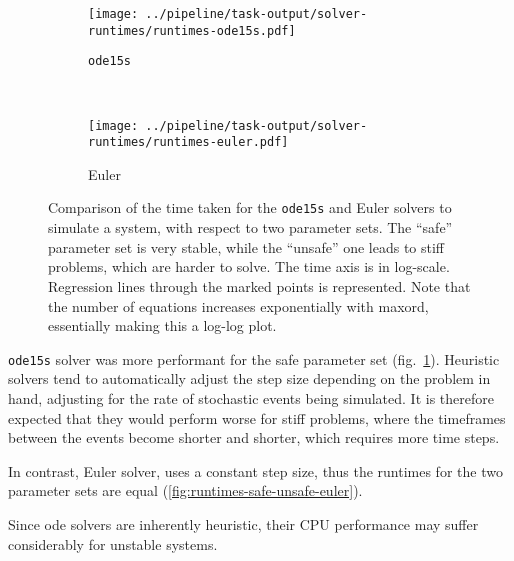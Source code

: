 \begin{figure}[tb]
   \centering
   \begin{subfigure}[t]{0.45\textwidth}
       \texttt{[image: ../pipeline/task-output/solver-runtimes/runtimes-ode15s.pdf]}
       \caption{\texttt{ode15s}}
       \label{fig:runtimes-safe-unsafe-ode15s}
   \end{subfigure}
   ~
   \begin{subfigure}[t]{0.45\textwidth}
       \texttt{[image: ../pipeline/task-output/solver-runtimes/runtimes-euler.pdf]}
       \caption{Euler}
       \label{fig:runtimes-safe-unsafe-euler}
   \end{subfigure}
   
    \caption{Comparison of the time taken for the {\tt ode15s} and Euler solvers to simulate a system, with respect to two parameter sets.
     The ``safe'' parameter set is very stable, while the ``unsafe'' one leads to stiff problems, which are harder to solve.
    The time axis is in log-scale. Regression lines through the marked points is represented.
    Note that the number of equations increases exponentially with \gls{maxord}, essentially making this a log-log plot.}
\label{fig:runtimes-safe-unsafe}
\end{figure}

\texttt{ode15s} solver was more performant for the safe parameter set (fig.~\ref{fig:runtimes-safe-unsafe-ode15s}).
Heuristic solvers tend to automatically adjust the step size depending on the problem in hand, adjusting for the rate of stochastic events being simulated.
It is therefore expected that they would perform worse for stiff problems, where the timeframes between the events become shorter and shorter, which requires more time steps.

In contrast, Euler solver, uses a constant step size, thus the runtimes for the two parameter sets are equal (\autoref{fig:runtimes-safe-unsafe-euler}).

Since \gls{ode} solvers are inherently heuristic, their CPU performance may suffer considerably for unstable systems.

